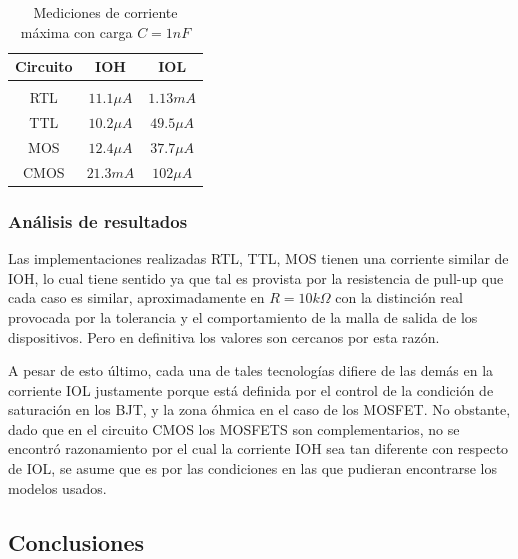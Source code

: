 \begin{table}[H]
    \centering
    \begin{tabular}{c c c}
        Circuito & IOH & IOL \\
        \hline \\
        RTL & $11.1 \mu A$ & $1.13m A$ \\
        TTL & $10.2 \mu A$ & $49.5 \mu A$ \\
        MOS & $12.4 \mu A$ & $37.7 \mu A$ \\
        CMOS & $21.3mA$ & $102\mu A$ \\
        \hline
    \end{tabular}
    \caption{Mediciones de corriente m\'axima con carga $C = 1nF$}
\end{table}

\subsubsection{An\'alisis de resultados}
Las implementaciones realizadas RTL, TTL, MOS tienen una corriente similar de IOH, lo cual tiene sentido ya que tal es provista
por la resistencia de pull-up que cada caso es similar, aproximadamente en $R = 10k \Omega$ con la distinci\'on real provocada por la tolerancia y el comportamiento
de la malla de salida de los dispositivos. Pero en definitiva los valores son cercanos por esta raz\'on.

A pesar de esto \'ultimo, cada una de tales tecnolog\'ias difiere de las dem\'as en la corriente IOL justamente porque est\'a definida por el control de la condici\'on de saturaci\'on en los BJT, y la zona \'ohmica en el caso
de los MOSFET. No obstante, dado que en el circuito CMOS los MOSFETS son complementarios, no se encontr\'o razonamiento por el cual la corriente IOH sea tan diferente con respecto de IOL, se asume que es por las condiciones
en las que pudieran encontrarse los modelos usados.

\subsection{Conclusiones}
